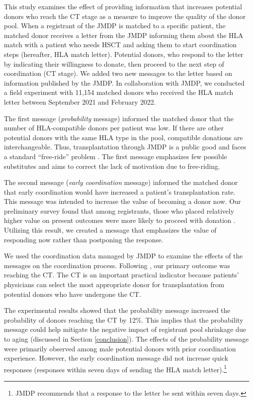 \documentclass[12pt, a4paper]{article}
\begin{document}
This study examines the effect of providing information that increases potential donors who reach the CT stage as a measure to improve the quality of the donor pool. When a registrant of the JMDP is matched to a specific patient, the matched donor receives a letter from the JMDP informing them about the HLA match with a patient who needs HSCT and asking them to start coordination steps (hereafter, HLA match letter). Potential donors, who respond to the letter by indicating their willingness to donate, then proceed to the next step of coordination (CT stage). We added two new messages to the letter based on information published by the JMDP. In collaboration with JMDP, we conducted a field experiment with 11,154 matched donors who received the HLA match letter between September 2021 and February 2022.

The first message (\emph{probability} message) informed the matched donor that the number of HLA-compatible donors per patient was low. If there are other potential donors with the same HLA type in the pool, compatible donations are interchangeable. Thus, transplantation through JMDP is a public good and faces a standard ``free-ride'' problem \citep{Bergstrom2009}. The first message emphasizes few possible substitutes and aims to correct the lack of motivation due to free-riding.

The second message (\emph{early coordination} message) informed the matched donor that early coordination would have increased a patient's transplantation rate. This message was intended to increase the value of becoming a donor now. Our preliminary survey found that among registrants, those who placed relatively higher value on present outcomes were more likely to proceed with donation \citep{Ohtake2020}. Utilizing this result, we created a message that emphasizes the value of responding now rather than postponing the response.

We used the coordination data managed by JMDP to examine the effects of the messages on the coordination process. Following \citet{Haylock2024}, our primary outcome was reaching the CT. The CT is an important practical indicator because patients' physicians can select the most appropriate donor for transplantation from potential donors who have undergone the CT.

The experimental results showed that the probability message increased the probability of donors reaching the CT by 12\%. This implies that the probability message could help mitigate the negative impact of registrant pool shrinkage due to aging (discussed in Section \ref{conclusion}). The effects of the probability message were primarily observed among male potential donors with prior coordination experience. However, the early coordination message did not increase quick responses (responses within seven days of sending the HLA match letter).\footnote{JMDP recommends that a response to the letter be sent within seven days.}
\end{document}

